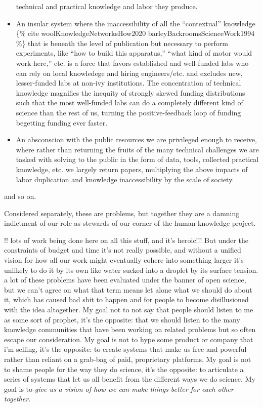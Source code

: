 \documentclass{article}
\begin{document}
\begin{itemize}
  technical and practical knowledge and labor they produce.
\item
  An insular system where the inaccessibility of all the ``contextual''
  knowledge \{\% cite woolKnowledgeNetworksHow2020
  barleyBackroomsScienceWork1994 \%\} that is beneath the level of
  publication but necessary to perform experiments, like ``how to build
  this apparatus,'' ``what kind of motor would work here,'' etc. is a
  force that favors established and well-funded labs who can rely on
  local knowledege and hiring engineers/etc. and excludes new,
  lesser-funded labs at non-ivy institutions. The concentration of
  technical knowledge magnifies the inequity of strongly skewed funding
  distributions such that the most well-funded labs can do a completely
  different kind of science than the rest of us, turning the
  positive-feedback loop of funding begetting funding ever faster.
\item
  An absconscion with the public resources we are privileged enough to
  receive, where rather than returning the fruits of the many technical
  challenges we are tasked with solving to the public in the form of
  data, tools, collected practical knowledge, etc. we largely return
  papers, multiplying the above impacts of labor duplication and
  knowledge inaccessibility by the scale of society.
\end{itemize}

and so on.

Considered separately, these are problems, but together they are a
damning indictment of our role as stewards of our corner of the human
knowledge project.

!! lots of work being done here on all this stuff, and it's heroic!!!
But under the constraints of budget and time it's not really possible,
and without a unified vision for how all our work might eventually
cohere into something larger it's unlikely to do it by its own like
water sucked into a droplet by its surface tension. a lot of these
problems have been evaluated under the banner of open science, but we
can't agree on what that term means let alone what we should do about
it, which has caused bad shit to happen and for people to become
disillusioned with the idea altogether. My goal not to not say that
people should listen to me as some sort of prophet, it's the opposite:
that we should listen to the many knowledge communities that have been
working on related problems but so often escape our consideration. My
goal is not to hype some product or company that i'm selling, it's the
opposite: to create systems that make us free and powerful rather than
reliant on a grab-bag of paid, proprietary platforms. My goal is not to
shame people for the way they do science, it's the opposite: to
articulate a series of systems that let us all benefit from the
different ways we do science. My goal is to \emph{give us a vision of
how we can make things better for each other together.}
\end{document}
